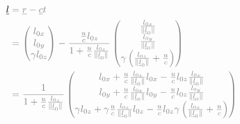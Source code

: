 \begin{derivation}
	\begin{equation}
		\begin{aligned}
			\underline{l}
			 & \color{gray} = \underline{r} - \underline{c} t
			\\
			 & \color{gray} =
			\begin{pmatrix}
				l_{0x}          \\
				l_{0y}          \\
				{\gamma} l_{0z} \\
			\end{pmatrix}
			-
			\frac{ \frac{u}{c} {l_{0z}}}{ 1 + \frac{u}{c} \frac{l_{0z}}{\|\underline{l}_0\|} }
			\begin{pmatrix}
				\frac{l_{0x}}{\|\underline{l}_0\|}                                      \\
				\frac{l_{0y}}{\|\underline{l}_0\|}                                      \\
				\gamma \left( \frac{l_{0z}}{\|\underline{l}_0\|} + \frac{u}{c}  \right) \\
			\end{pmatrix} \\
			 & \color{gray} =
			\frac{ 1 }{ 1 + \frac{u}{c} \frac{l_{0z}}{\|\underline{l}_0\|} }
			\begin{pmatrix}
				l_{0x} + \frac{u}{c} \frac{l_{0z}}{\|\underline{l}_0\|} l_{0x} - \frac{u}{c} {l_{0z}} \frac{l_{0x}}{\|\underline{l}_0\|}                                                         \\
				l_{0y} + \frac{u}{c} \frac{l_{0z}}{\|\underline{l}_0\|} l_{0y} - \frac{u}{c} {l_{0z}} \frac{l_{0y}}{\|\underline{l}_0\|}                                                         \\
				{\gamma} l_{0z} + {\gamma} \frac{u}{c} \frac{l_{0z}}{\|\underline{l}_0\|} l_{0z} - \frac{u}{c} {l_{0z}}  \gamma \left( \frac{l_{0z}}{\|\underline{l}_0\|} + \frac{u}{c}  \right) \\
			\end{pmatrix}
		\end{aligned}
	\end{equation}


\end{derivation}
